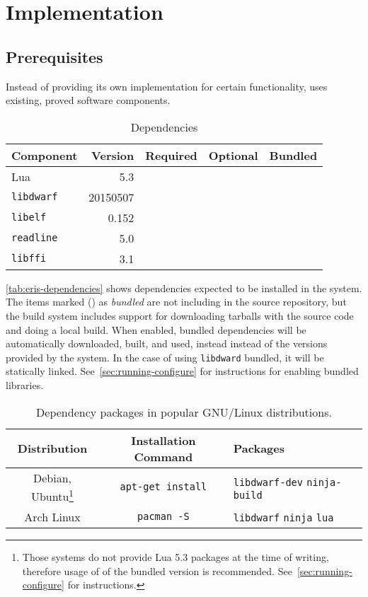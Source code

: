 
\chapter{Implementation}

\section{Prerequisites}

Instead of providing its own implementation for certain functionality, \Eris*
uses existing, proved software components.

\begin{table}[h]
	\centering
	\begin{tabular}{lrccc}
		\toprule
		Component & Version  & Required & Optional & Bundled \\
		\midrule
		Lua             & 5.3      & \Tick &       & \Tick \\
		\verb|libdwarf| & 20150507 & \Tick &       & \Tick \\
		\verb|libelf|   & 0.152    & \Tick &       & \\
		\verb|readline| & 5.0      &       & \Tick & \\
		\verb|libffi|   & 3.1      & \Tick &       & \\
		\bottomrule
	\end{tabular}
	\caption{Dependencies}
	\label{tab:eris-dependencies}
\end{table}

\autoref{tab:eris-dependencies} shows dependencies expected to be installed in
the system. The items marked (\inlinesymbol\Tick) as \emph{bundled} are not including in
the source repository, but the build system includes support for downloading
tarballs with the source code and doing a local build. When enabled, bundled
dependencies will be automatically downloaded, built, and used, instead
instead of the versions provided by the system. In the case of using
\verb|libdward| bundled, it will be statically linked.
See~\autoref{sec:running-configure} for instructions for enabling bundled
libraries.

\begin{table}
  \begin{tabular}{ccp{}}
  \toprule
	Distribution & Installation Command & Packages \\
	\midrule
	Debian, Ubuntu\footnote{Those systems do not provide Lua 5.3 packages
	at the time of writing, therefore usage of of the bundled version is
	recommended. See~\autoref{sec:running-configure} for instructions.} &
    \verb|apt-get install| &
    \verb|libdwarf-dev| \verb|ninja-build| \\
	Arch Linux & \verb|pacman -S| & \verb|libdwarf| \verb|ninja| \verb|lua| \\
	\bottomrule
  \end{tabular}
  \caption{Dependency packages in popular GNU/Linux distributions.}
  \label{tab:distro-dependency-packages}
\end{table}

